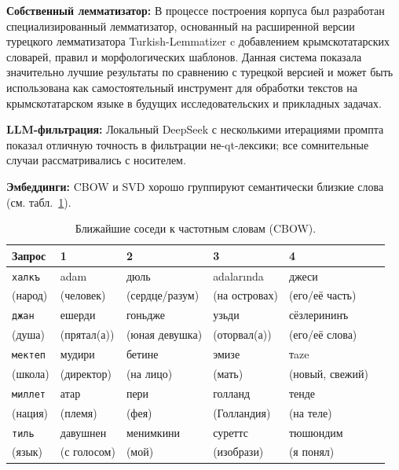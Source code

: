 \documentclass{article}
\begin{document}
\textbf{Собственный лемматизатор:} В процессе построения корпуса был разработан специализированный лемматизатор, основанный на расширенной версии турецкого лемматизатора Turkish-Lemmatizer c добавлением крымскотатарских словарей, правил и морфологических шаблонов. Данная система показала значительно лучшие результаты по сравнению с турецкой версией и может быть использована как самостоятельный инструмент для обработки текстов на крымскотатарском языке в будущих исследовательских и прикладных задачах.

\textbf{LLM-фильтрация:} Локальный DeepSeek с несколькими итерациями промпта показал отличную точность в фильтрации не-qt-лексики; все сомнительные случаи рассматривались с носителем.

\textbf{Эмбеддинги:} CBOW и SVD хорошо группируют семантически близкие слова (см. табл.~\ref{tab:neighbors}).

\begin{table}[!tbh]
    \centering
    \begin{tabular}{|l|l|l|l|l|l|}
\hline
\textbf{Запрос} & \textbf{1} & \textbf{2} & \textbf{3} & \textbf{4} \\
\hline
\texttt{халкъ} & adam & дюль & adalarında & джеси \\
(народ) & (человек) & (сердце/разум)\footnotemark[1] & (на островах) & (его/её часть)\footnotemark[2] \\
\hline
\texttt{джан}   & ешерди & гоньдже & узьди & сёзлерининъ \\
(душа) & (прятал(а)) & (юная девушка) & (оторвал(а)) & (его/её слова) \\
\hline
\texttt{мектеп} & мудири & бетине & эмизе & тaze \\
(школа) & (директор) & (на лицо) & (мать) & (новый, свежий) \\
\hline
\texttt{миллет} & атар & пери & голланд & тенде \\
(нация) & (племя)\footnotemark[3] & (фея) & (Голландия) & (на теле) \\
\hline
\texttt{тиль} & давушнен & менимкини & суреттс & тюшюндим \\
(язык) & (с голосом) & (мой) & (изобрази) & (я понял) \\
\hline
    \end{tabular}
    \caption{Ближайшие соседи к частотным словам (CBOW).}
    \label{tab:neighbors}
\end{table}

\end{document}
